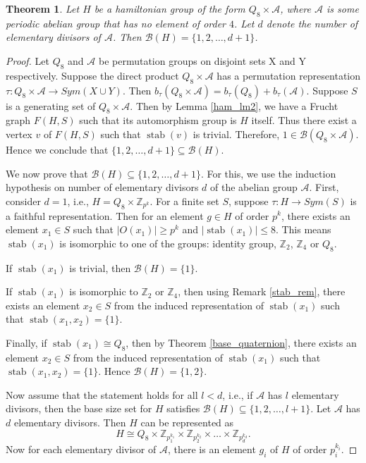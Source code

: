 \documentclass[12pt]{article}
\theoremstyle{plain}
\newtheorem{theorem}{Theorem}[section]
\theoremstyle{definition}
\newcommand{\stab}{\mathop{\mathrm{stab}}}
\begin{document}
	
	\begin{theorem}
		\label{base_hamiltonian}
		Let $H$ be a hamiltonian group of the form $Q_{8} \times \mathcal{A}$, where $\mathcal{A}$ is some periodic abelian group that has no element of order $4$. Let $d$ denote the number of elementary divisors of $\mathcal{A}$. Then $\mathcal{B}(H) = \{1,2,\ldots,d+1\}$. 
	\end{theorem}
	\begin{proof}
	Let $Q_{8}$ and $\mathcal{A}$ be permutation groups on disjoint sets X and Y respectively. Suppose the direct product $Q_{8} \times \mathcal{A}$ has a permutation representation $\tau : Q_{8} \times \mathcal{A} \to  Sym(X \cup Y)$. Then $b_{\tau}(Q_{8} \times \mathcal{A}) = b_{\tau}(Q_{8}) + b_{\tau}(\mathcal{A})$. Suppose $S$ is a generating set of $Q_{8} \times \mathcal{A}$. Then by Lemma \ref{ham_lm2}, we have a Frucht graph $F(H,S)$ such that its automorphism group is $H$ itself. Thus there exist a vertex $v$  of $F(H,S)$ such that $\stab(v)$ is trivial. Therefore, $1 \in \mathcal{B}(Q_{8} \times \mathcal{A})$. Hence we conclude that $\{1,2,\ldots,d+1\} \subseteq \mathcal{B}(H)$.\medskip
		
		We now prove that $\mathcal{B}(H) \subseteq \{1,2,\ldots,d+1\}$. For this, we use the induction hypothesis on number of elementary divisors $d$ of the abelian group $\mathcal{A}$. First, consider $d =1$, i.e., $H = Q_{8} \times \mathbb{Z}_{p^{k}}$. For a finite set $S$, suppose $\tau : H \to Sym(S)$ is a faithful representation. Then for an element $g \in H$ of order $p^{k}$, there exists an element $x_{1} \in S$ such that $|O(x_{1})| \geq p^{k}$ and $|\stab(x_{1})| \leq 8$. This means $\stab(x_{1})$ is isomorphic to one of the groups: identity group, $\mathbb{Z}_{2}$, $\mathbb{Z}_{4}$ or $Q_{8}$. \medskip
			
			If $\stab(x_{1})$ is trivial,  then $\mathcal{B}(H) = \{1\}$.\medskip
			
			If $\stab(x_{1})$ is isomorphic to $\mathbb{Z}_{2}$ or $\mathbb{Z}_{4}$, then using Remark \ref{stab_rem}, there exists an element $x_{2} \in S$ from the induced representation of $\stab(x_{1})$ such that $\stab(x_{1},x_{2}) = \{1\}$.\medskip 
				
			Finally, if $\stab(x_{1}) \cong Q_{8}$, then by Theorem \ref{base_quaternion}, there exists an element $x_{2} \in S$ from the induced representation of $\stab(x_{1})$ such that $\stab(x_{1},x_{2}) = \{1\}$. Hence $\mathcal{B}(H) = \{1,2\}$.\medskip
		
		Now assume that the statement holds for all $l < d$, i.e., if $\mathcal{A}$ has $l$ elementary divisors, then the base size set for $H$ satisfies $\mathcal{B}(H) \subseteq \{1,2,\ldots,l+1\}$. Let $\mathcal{A}$ has $d$ elementary divisors. Then $H$ can be represented as
		\[ H \cong Q_{8} \times \mathbb{Z}_{p_{1}^{k_{1}}} \times \mathbb{Z}_{p_{2}^{k_{2}}} \times \ldots \times \mathbb{Z}_{p_{d}^{k_{d}}}.\]
		Now for each elementary divisor of $\mathcal{A}$, there is an element $g_{i}$ of $H$ of order $p_{i}^{k_{i}}$.\medskip
		

\end{proof}
\end{document}
